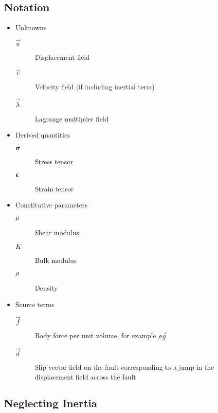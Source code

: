 \subsection{Notation}
\begin{itemize}
\item Unknowns
  \begin{description}
  \item[$\vec{u}$] Displacement field
  \item[$\vec{v}$] Velocity field (if including inertial term)
  \item[$\vec{\lambda}$] Lagrange multiplier field
  \end{description}
\item Derived quantities
  \begin{description}
    \item[$\bm{\sigma}$] Stress tensor
    \item[$\bm{\epsilon}$] Strain tensor
  \end{description}
\item Constitutive parameters
  \begin{description}
  \item[$\mu$] Shear modulus
  \item[$K$] Bulk modulus
  \item[$\rho$] Density
  \end{description}
\item Source terms
  \begin{description}
    \item[$\vec{f}$] Body force per unit volume, for example $\rho \vec{g}$
    \item[$\vec{d}$] Slip vector field on the fault corresponding to a
      jump in the displacement field across the fault
  \end{description}
\end{itemize}

\subsection{Neglecting Inertia}

